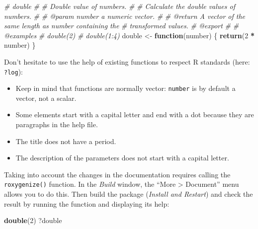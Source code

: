 \documentclass[
  12pt,
  american,
  a4paper,
  extrafontsizes,onecolumn,openright
  ]{memoir}
\newenvironment{Shaded}{\begin{snugshade}}{\end{snugshade}}
\newcommand{\CommentTok}[1]{\textcolor[rgb]{0.56,0.35,0.01}{\textit{#1}}}
\newcommand{\ControlFlowTok}[1]{\textcolor[rgb]{0.13,0.29,0.53}{\textbf{#1}}}
\newcommand{\DecValTok}[1]{\textcolor[rgb]{0.00,0.00,0.81}{#1}}
\newcommand{\FunctionTok}[1]{\textcolor[rgb]{0.13,0.29,0.53}{\textbf{#1}}}
\newcommand{\NormalTok}[1]{#1}
\newcommand{\OtherTok}[1]{\textcolor[rgb]{0.56,0.35,0.01}{#1}}
\newcommand{\SpecialCharTok}[1]{\textcolor[rgb]{0.81,0.36,0.00}{\textbf{#1}}}
\providecommand{\tightlist}{%
  \setlength{\itemsep}{0pt}\setlength{\parskip}{0pt}}
\begin{document}
\begin{Shaded}
\begin{Highlighting}[]
\CommentTok{\#\textquotesingle{} double}
\CommentTok{\#\textquotesingle{} }
\CommentTok{\#\textquotesingle{} Double value of numbers.}
\CommentTok{\#\textquotesingle{}}
\CommentTok{\#\textquotesingle{} Calculate the double values of numbers.}
\CommentTok{\#\textquotesingle{} }
\CommentTok{\#\textquotesingle{} @param number a numeric vector.}
\CommentTok{\#\textquotesingle{}}
\CommentTok{\#\textquotesingle{} @return A vector of the same length as \textasciigrave{}number\textasciigrave{} containing the }
\CommentTok{\#\textquotesingle{}   transformed values.}
\CommentTok{\#\textquotesingle{} @export}
\CommentTok{\#\textquotesingle{}}
\CommentTok{\#\textquotesingle{} @examples}
\CommentTok{\#\textquotesingle{} double(2)}
\CommentTok{\#\textquotesingle{} double(1:4)}
\NormalTok{double }\OtherTok{\textless{}{-}} \ControlFlowTok{function}\NormalTok{(number) \{}
    \FunctionTok{return}\NormalTok{(}\DecValTok{2} \SpecialCharTok{*}\NormalTok{ number)}
\NormalTok{\}}
\end{Highlighting}
\end{Shaded}

\normalsize

Don't hesitate to use the help of existing functions to respect R standards (here: \texttt{?log}):

\begin{itemize}
\tightlist
\item
  Keep in mind that functions are normally vector: \texttt{number} is by default a vector, not a scalar.
\item
  Some elements start with a capital letter and end with a dot because they are paragraphs in the help file.
\item
  The title does not have a period.
\item
  The description of the parameters does not start with a capital letter.
\end{itemize}

Taking into account the changes in the documentation requires calling the \texttt{roxygenize()} function.
In the \emph{Build} window, the \enquote{More \textgreater{} Document} menu allows you to do this.
Then build the package (\emph{Install and Restart}) and check the result by running the function and displaying its help:

\scriptsize

\begin{Shaded}
\begin{Highlighting}[]
\FunctionTok{double}\NormalTok{(}\DecValTok{2}\NormalTok{)}
\NormalTok{?double}
\end{Highlighting}
\end{Shaded}
\end{document}

